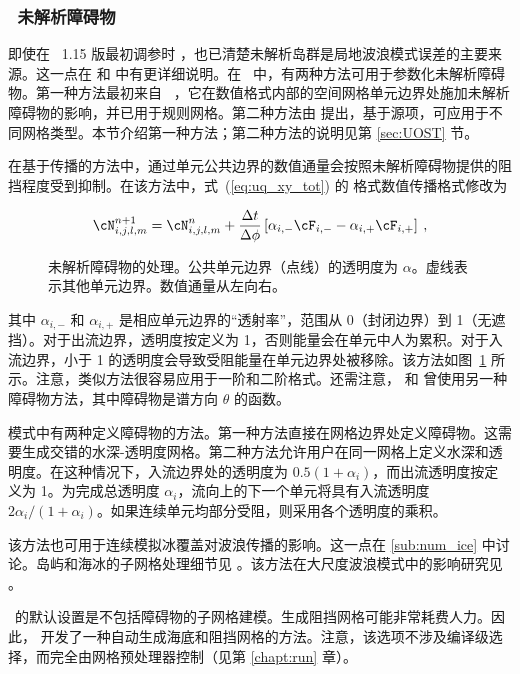 \vsssub
\subsubsection{~未解析障碍物} \label{sub:num_obst}

\noindent
即使在 \ws\ 1.15 版最初调参时 \citep{tol:OMB02a}，也已清楚未解析岛群是局地波浪模式误差的主要来源。这一点在 \citet[][图~3]{tol:Waves01a} 和 \citet[][图~8]{tol:WaF02} 中有更详细说明。在 \ws\ 中，有两种方法可用于参数化未解析障碍物。第一种方法最初来自 \swan\ \citep{art:BRH99,man:SWAN3}，它在数值格式内部的空间网格单元边界处施加未解析障碍物的影响，并已用于规则网格。第二种方法由 \citep{art:Mentaschi2015b} 提出，基于源项，可应用于不同网格类型。本节介绍第一种方法；第二种方法的说明见第 \ref{sec:UOST} 节。

在基于传播的方法中，通过单元公共边界的数值通量会按照未解析障碍物提供的阻挡程度受到抑制。在该方法中，式~(\ref{eq:uq_xy_tot}) 的 \uq{} 格式数值传播格式修改为


\begin{equation}
\cN_{i,j,l,m}^{n+1} = \cN_{i,j,l,m}^n +
\frac{\Delta t}{\Delta \phi} \left [ \alpha_{i,-} \cF_{i,-} - \alpha_{i,+} \cF_{i,+} \right ]
\: , \label{eq:uq_xy_obstr} \end{equation}

\begin{figure} \begin{center}
\caption{未解析障碍物的处理。公共单元边界（点线）的透明度为 $\alpha$。虚线表示其他单元边界。数值通量从左向右。}
         \label{fig:obstr} \botline
\end{center}
\end{figure}

\noindent
其中 $\alpha_{i,-}$ 和 $\alpha_{i,+}$ 是相应单元边界的“透射率”，范围从 0（封闭边界）到 1（无遮挡）。对于出流边界，透明度按定义为 1，否则能量会在单元中人为累积。对于入流边界，小于 1 的透明度会导致受阻能量在单元边界处被移除。该方法如图~\ref{fig:obstr} 所示。注意，类似方法很容易应用于一阶和二阶格式。还需注意，\cite{art:HY96} 和 \cite{art:HMM00} 曾使用另一种障碍物方法，其中障碍物是谱方向 $\theta$ 的函数。

模式中有两种定义障碍物的方法。第一种方法直接在网格边界处定义障碍物。这需要生成交错的水深-透明度网格。第二种方法允许用户在同一网格上定义水深和透明度。在这种情况下，入流边界处的透明度为 $0.5(1+\alpha_i)$，而出流透明度按定义为 1。为完成总透明度 $\alpha_i$，流向上的下一个单元将具有入流透明度 $2\alpha_i/(1+\alpha_i)$。如果连续单元均部分受阻，则采用各个透明度的乘积。

该方法也可用于连续模拟冰覆盖对波浪传播的影响。这一点在 \para\ref{sub:num_ice} 中讨论。岛屿和海冰的子网格处理细节见 \cite{tol:OMOD03a}。该方法在大尺度波浪模式中的影响研究见 \cite{tol:OMB02b,tol:OMOD03a}。

\ws\ 的默认设置是不包括障碍物的子网格建模。生成阻挡网格可能非常耗费人力。因此，\cite{tol:MMAB07a, tol:OMOD08a} 开发了一种自动生成海底和阻挡网格的方法。注意，该选项不涉及编译级选择，而完全由网格预处理器控制（见第 \ref{chapt:run} 章）。

